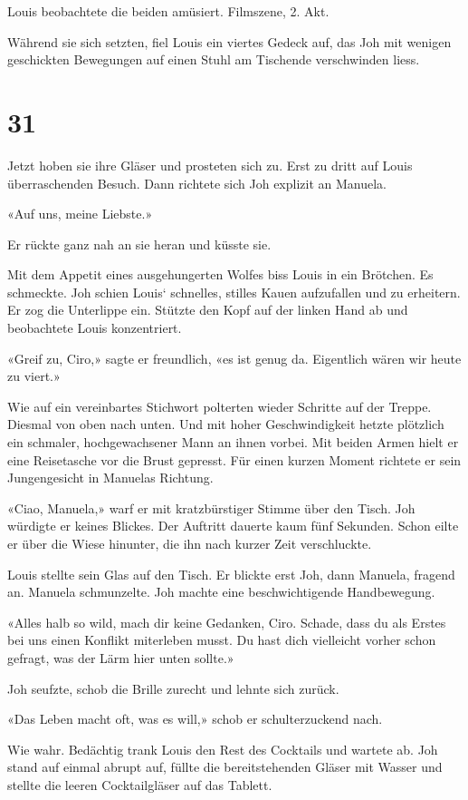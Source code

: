 Louis beobachtete die beiden amüsiert. Filmszene, 2. Akt.

Während sie sich setzten, fiel Louis ein viertes Gedeck auf, das Joh mit
wenigen geschickten Bewegungen auf einen Stuhl am Tischende verschwinden
liess.

\chapter{31}\label{section-30}

Jetzt hoben sie ihre Gläser und prosteten sich zu. Erst zu dritt auf
Louis überraschenden Besuch. Dann richtete sich Joh explizit an Manuela.

«Auf uns, meine Liebste.»

Er rückte ganz nah an sie heran und küsste sie.

Mit dem Appetit eines ausgehungerten Wolfes biss Louis in ein Brötchen.
Es schmeckte. Joh schien Louis` schnelles, stilles Kauen aufzufallen und
zu erheitern. Er zog die Unterlippe ein. Stützte den Kopf auf der linken
Hand ab und beobachtete Louis konzentriert.

«Greif zu, Ciro,» sagte er freundlich, «es ist genug da. Eigentlich
wären wir heute zu viert.»

Wie auf ein vereinbartes Stichwort polterten wieder Schritte auf der
Treppe. Diesmal von oben nach unten. Und mit hoher Geschwindigkeit
hetzte plötzlich ein schmaler, hochgewachsener Mann an ihnen vorbei. Mit
beiden Armen hielt er eine Reisetasche vor die Brust gepresst. Für einen
kurzen Moment richtete er sein Jungengesicht in Manuelas Richtung.

«Ciao, Manuela,» warf er mit kratzbürstiger Stimme über den Tisch. Joh
würdigte er keines Blickes. Der Auftritt dauerte kaum fünf Sekunden.
Schon eilte er über die Wiese hinunter, die ihn nach kurzer Zeit
verschluckte.

Louis stellte sein Glas auf den Tisch. Er blickte erst Joh, dann
Manuela, fragend an. Manuela schmunzelte. Joh machte eine
beschwichtigende Handbewegung.

«Alles halb so wild, mach dir keine Gedanken, Ciro. Schade, dass du als
Erstes bei uns einen Konflikt miterleben musst. Du hast dich vielleicht
vorher schon gefragt, was der Lärm hier unten sollte.»

Joh seufzte, schob die Brille zurecht und lehnte sich zurück.

«Das Leben macht oft, was es will,» schob er schulterzuckend nach.

Wie wahr. Bedächtig trank Louis den Rest des Cocktails und wartete ab.
Joh stand auf einmal abrupt auf, füllte die bereitstehenden Gläser mit
Wasser und stellte die leeren Cocktailgläser auf das Tablett.

